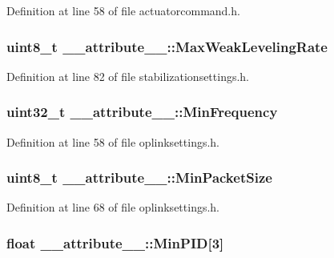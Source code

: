 \-Definition at line 58 of file actuatorcommand.\-h.

\hypertarget{struct____attribute_____a0177eb3a128dabee11cb03d3cf850bb7}{
\subsubsection[{\-Max\-Weak\-Leveling\-Rate}]{\setlength{\rightskip}{0pt plus 5cm}uint8\-\_\-t {\bf \-\_\-\-\_\-attribute\-\_\-\-\_\-\-::\-Max\-Weak\-Leveling\-Rate}}}\label{struct____attribute_____a0177eb3a128dabee11cb03d3cf850bb7}


\-Definition at line 82 of file stabilizationsettings.\-h.

\hypertarget{struct____attribute_____af4238aa7e321ac0d9825e3c3e88e2dcd}{
\subsubsection[{\-Min\-Frequency}]{\setlength{\rightskip}{0pt plus 5cm}uint32\-\_\-t {\bf \-\_\-\-\_\-attribute\-\_\-\-\_\-\-::\-Min\-Frequency}}}\label{struct____attribute_____af4238aa7e321ac0d9825e3c3e88e2dcd}


\-Definition at line 58 of file oplinksettings.\-h.

\hypertarget{struct____attribute_____a5f8cf38b97f0831b9827da7bfd5adfca}{
\subsubsection[{\-Min\-Packet\-Size}]{\setlength{\rightskip}{0pt plus 5cm}uint8\-\_\-t {\bf \-\_\-\-\_\-attribute\-\_\-\-\_\-\-::\-Min\-Packet\-Size}}}\label{struct____attribute_____a5f8cf38b97f0831b9827da7bfd5adfca}


\-Definition at line 68 of file oplinksettings.\-h.

\hypertarget{struct____attribute_____a0868c51382bdad1829a5e6011a979e1b}{
\subsubsection[{\-Min\-P\-I\-D}]{\setlength{\rightskip}{0pt plus 5cm}float {\bf \-\_\-\-\_\-attribute\-\_\-\-\_\-\-::\-Min\-P\-I\-D}\mbox{[}3\mbox{]}}}\label{struct____attribute_____a0868c51382bdad1829a5e6011a979e1b}


